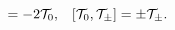 \begin{equation}
	[{\cal T}_{+},{\cal T_{-}}]=-2 {\cal T}_{0},\;\;\;
	[{\cal T}_{0},{\cal T}_{\pm}]=\pm {\cal T}_{\pm}.
\end{equation}

